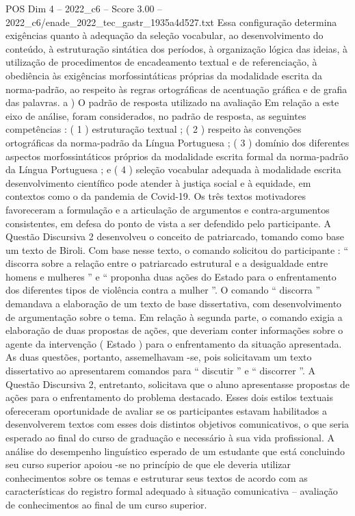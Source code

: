 \begin{textsample}{POS Dim 4 – 2022\_c6 – Score 3.00 – 2022\_c6/enade\_2022\_tec\_gastr\_1935a4d527.txt}
Essa configuração determina exigências quanto à adequação da seleção vocabular, ao desenvolvimento do conteúdo, à estruturação sintática dos períodos, à organização lógica das ideias, à utilização de procedimentos de encadeamento textual e de referenciação, à obediência às exigências morfossintáticas próprias da modalidade escrita da norma-padrão, ao respeito às regras ortográficas de acentuação gráfica e de grafia das palavras. a ) O padrão de resposta utilizado na avaliação Em relação a este eixo de análise, foram considerados, no padrão de resposta, as seguintes competências : ( 1 ) estruturação textual ; ( 2 ) respeito às convenções ortográficas da norma-padrão da Língua Portuguesa ; ( 3 ) domínio dos diferentes aspectos morfossintáticos próprios da modalidade escrita formal da norma-padrão da Língua Portuguesa ; e ( 4 ) seleção vocabular adequada à modalidade escrita desenvolvimento científico pode atender à justiça social e à equidade, em contextos como o da pandemia de Covid-19.
Os três textos motivadores favoreceram a formulação e a articulação de argumentos e contra-argumentos consistentes, em defesa do ponto de vista a ser defendido pelo participante.
A Questão Discursiva 2 desenvolveu o conceito de patriarcado, tomando como base um texto de Biroli.
Com base nesse texto, o comando solicitou do participante : “ discorra sobre a relação entre o patriarcado estrutural e a desigualdade entre homens e mulheres ” e “ proponha duas ações do Estado para o enfrentamento dos diferentes tipos de violência contra a mulher ”.
O comando “ discorra ” demandava a elaboração de um texto de base dissertativa, com desenvolvimento de argumentação sobre o tema.
Em relação à segunda parte, o comando exigia a elaboração de duas propostas de ações, que deveriam conter informações sobre o agente da intervenção ( Estado ) para o enfrentamento da situação apresentada.
As duas questões, portanto, assemelhavam -se, pois solicitavam um texto dissertativo ao apresentarem comandos para “ discutir ” e “ discorrer ”.
A Questão Discursiva 2, entretanto, solicitava que o aluno apresentasse propostas de ações para o enfrentamento do problema destacado.
Esses dois estilos textuais ofereceram oportunidade de avaliar se os participantes estavam habilitados a desenvolverem textos com esses dois distintos objetivos comunicativos, o que seria esperado ao final do curso de graduação e necessário à sua vida profissional.
A análise do desempenho linguístico esperado de um estudante que está concluindo seu curso superior apoiou -se no princípio de que ele deveria utilizar conhecimentos sobre os temas e estruturar seus textos de acordo com as características do registro formal adequado à situação comunicativa – avaliação de conhecimentos ao final de um curso superior.

\end{textsample}
